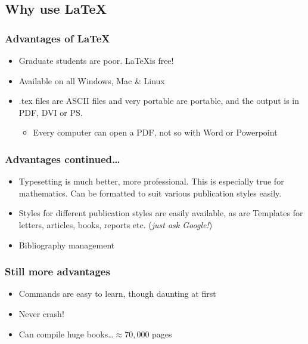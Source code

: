 \documentclass{beamer}
\begin{document}
\subsection{Why use \LaTeX}
\begin{frame}
   \frametitle{Advantages of \LaTeX}
   
   \begin{itemize}
      \item Graduate students are poor.  \LaTeX is free!
      
      \item Available on all Windows, Mac \& Linux
      
      \item .tex files are ASCII files and very portable are portable, and the output is in PDF, DVI or PS.
      \begin{itemize}
         \item Every computer can open a PDF, not so with Word or Powerpoint
      \end{itemize}
   \end{itemize}
\end{frame}
\begin{frame}
   \frametitle{Advantages continued\ldots}
   \begin{itemize}
      \item Typesetting is much better, more professional.  This is especially true for mathematics.  Can be formatted to suit various publication styles easily.
      
      \item Styles for different publication styles are easily available, as are Templates for letters, articles, books, reports etc. (\emph{just ask Google!})
      
      \item Bibliography management
   \end{itemize}

\end{frame}
\begin{frame}
   \frametitle{Still more advantages}
   \begin{itemize}
      \item Commands are easy to learn, though daunting at first
      
      \item Never crash!
      
      \item Can compile huge books\ldots $\approx70,000$ pages
   \end{itemize}

\end{frame}
\end{document}
